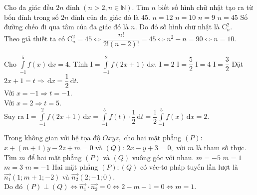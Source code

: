 \begin{ex}%
Cho đa giác đều $2n$ đỉnh $(n>2, n \in \mathbb{N}).$ Tìm $n$ biết số hình chữ nhật tạo ra từ bốn đỉnh trong số $2n$ đỉnh của đa giác đó là $45.$
\choice
{$n=12$}
{\True $n=10$}
{$n=9$}
{$n=45$}
\loigiai
{
Số đường chéo đi qua tâm của đa giác đó là $n$. Do đó số hình chữ nhật là $\mathrm{C}_n^2.$\\
Theo giả thiết ta có $\mathrm{C}_n^2=45 \Leftrightarrow \dfrac{n!}{2!(n-2)!}=45 \Leftrightarrow n^2 -n =90 \Leftrightarrow n=10.$
}
\end{ex}
\begin{ex}%
Cho $\displaystyle\int\limits_{-1}^5 f(x)\mathrm{\,d}x =4.$ Tính $\mathrm{I}= \displaystyle\int\limits_{-1}^2 f(2x+1)\mathrm{\,d}x$.
\choice
{\True $\mathrm{I}=2$}
{$\mathrm{I}=\dfrac{5}{2}$}
{$\mathrm{I}=4$}
{$\mathrm{I}=\dfrac{3}{2}$}
\loigiai
{ Đặt $2x+1=t \Rightarrow \mathrm{\,d}x = \dfrac{1}{2}\mathrm{\,d}t .$\\
Với $x=-1 \Rightarrow t=-1.$\\
Với $x=2 \Rightarrow t=5.$\\
Suy ra $\mathrm{I}= \displaystyle\int\limits_{-1}^2 f(2x+1)\mathrm{\,d}x = \displaystyle\int\limits_{-1}^5 f(t)\cdot \dfrac{1}{2}\mathrm{\,d}t =\dfrac{1}{2}\displaystyle\int\limits_{-1}^5 f(x)\mathrm{\,d}x =2.$
}
\end{ex}
\begin{ex}%
Trong không gian với hệ tọa độ $Oxyz,$ cho hai mặt phẳng $(P)$: $x+(m+1)y-2z+m=0$ và $(Q)$: $2x-y+3=0,$ với $m$ là tham số thực. Tìm $m$ để hai mặt phẳng $(P)$ và $(Q)$ vuông góc với nhau.
\choice
{$m=-5$}
{\True $m=1$}
{$m=3$}
{$m=-1$}
\loigiai
{ Hai mặt phẳng $(P); (Q)$ có véc-tơ pháp tuyến lần lượt là $\vec{n_1}(1;m+1;-2)$ và $\vec{n_2}(2;-1;0).$\\
Do đó $(P) \perp (Q) \Leftrightarrow \vec{n_1} \cdot \vec{n_2} =0 \Leftrightarrow 2-m-1=0 \Leftrightarrow m=1.$	
}
\end{ex}
